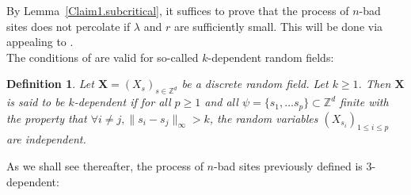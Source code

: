 \documentclass[10pt,a4paper]{amsart}
\theoremstyle{exampstyle}
\newtheorem{Definition}{Definition}
\theoremstyle{exampnotations}
\begin{document}
By Lemma~\ref{Claim1.subcritical}, it suffices to prove that the process of $n$-bad sites does not percolate if $\lambda$ and $r$ are sufficiently small. This will be done via appealing to \cite[Theorem 0.0]{liggett_domination_1997}. \\
The conditions of \cite[Theorem 0.0]{liggett_domination_1997} are valid for so-called $k$-dependent random fields:
\begin{Definition}
Let $ \mathbf{X}=(X_s)_{s \in \mathbb{Z}^{d}}$ be a discrete random field. Let $k \geq 1$. Then $\mathbf{X}$ is said to be $k$-dependent if for all $p \geq 1$ and all $\psi = \lbrace s_{1}, \ldots s_{p} \rbrace \subset \mathbb{Z}^{d}$ finite with the property that $\forall i \neq j, \lVert s_{i} - s_{j} \rVert_{\infty} > k $, the random variables $(X_{s_{i}})_{1 \leq i \leq p}$ are independent.
\end{Definition}

As we shall see thereafter, the process of $n$-bad sites previously defined is $3$-dependent:
\end{document}
